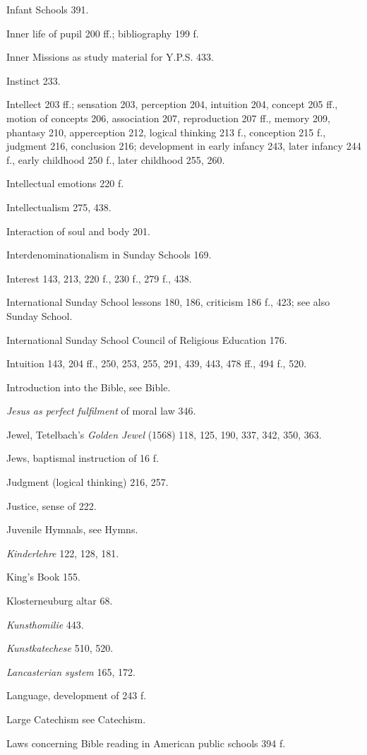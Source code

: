 Infant Schools 391.

Inner life of pupil 200 ff.; bibliography 199 f.

Inner Missions as study material for Y.P.S. 433.

Instinct 233.

Intellect 203 ff.; sensation 203, perception 204, intuition 204, concept 205 ff., motion of concepts 206, association 207, reproduction 207 ff., memory 209, phantasy 210, apperception 212, logical thinking 213 f., conception 215 f., judgment 216, conclusion 216; development in early infancy 243, later infancy 244 f., early childhood 250 f., later childhood 255, 260.

Intellectual emotions 220 f.

Intellectualism 275, 438.

Interaction of soul and body 201.

Interdenominationalism in Sunday Schools 169.

Interest 143, 213, 220 f., 230 f., 279 f., 438.

International Sunday School lessons 180, 186, criticism 186 f., 423; see also Sunday School.

International Sunday School Council of Religious Education 176.

Intuition 143, 204 ff., 250, 253, 255, 291, 439, 443, 478 ff., 494 f., 520.

Introduction into the Bible, see Bible.

\emph{Jesus as perfect fulfilment} of moral law 346.

Jewel, Tetelbach's \emph{Golden Jewel} (1568) 118, 125, 190, 337, 342, 350, 363.

Jews, baptismal instruction of 16 f.

Judgment (logical thinking) 216, 257.

Justice, sense of 222.

Juvenile Hymnals, see Hymns.

\emph{Kinderlehre} 122, 128, 181.

King's Book 155.

Klosterneuburg altar 68.

\emph{Kunsthomilie} 443.

\emph{Kunstkatechese} 510, 520.

\emph{Lancasterian system} 165, 172.

Language, development of 243 f.

Large Catechism see Catechism.

Laws concerning Bible reading in American public schools 394 f.

